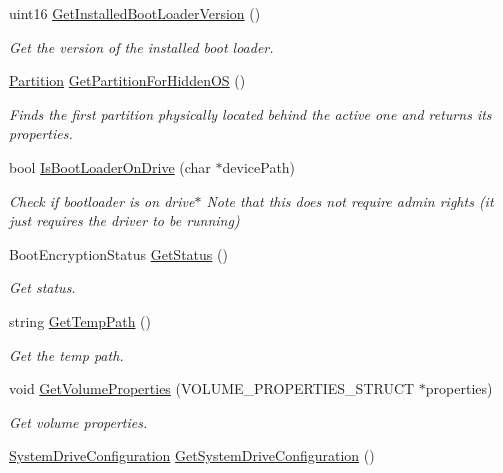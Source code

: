 \begin{DoxyCompactItemize}
uint16 \hyperlink{class_gost_crypt_1_1_boot_encryption_a438cec2387d7aab246d986d2a0128b21}{Get\+Installed\+Boot\+Loader\+Version} ()
\begin{DoxyCompactList}\small\item\em Get the version of the installed boot loader. \end{DoxyCompactList}\item 
\hyperlink{struct_gost_crypt_1_1_partition}{Partition} \hyperlink{class_gost_crypt_1_1_boot_encryption_a4af9421f27c8e568add543c8b09602b3}{Get\+Partition\+For\+Hidden\+OS} ()
\begin{DoxyCompactList}\small\item\em Finds the first partition physically located behind the active one and returns its properties. \end{DoxyCompactList}\item 
bool \hyperlink{class_gost_crypt_1_1_boot_encryption_a448f5e8fc2f4463a8147f702c2e2d217}{Is\+Boot\+Loader\+On\+Drive} (char $\ast$device\+Path)
\begin{DoxyCompactList}\small\item\em Check if bootloader is on drive$\ast$ Note that this does not require admin rights (it just requires the driver to be running) \end{DoxyCompactList}\item 
Boot\+Encryption\+Status \hyperlink{class_gost_crypt_1_1_boot_encryption_a55499453ff60a4484743a7f286702cba}{Get\+Status} ()
\begin{DoxyCompactList}\small\item\em Get status. \end{DoxyCompactList}\item 
string \hyperlink{class_gost_crypt_1_1_boot_encryption_ad7d1c3f18b8e3bc9133a1f8cabeb8f4d}{Get\+Temp\+Path} ()
\begin{DoxyCompactList}\small\item\em Get the temp path. \end{DoxyCompactList}\item 
void \hyperlink{class_gost_crypt_1_1_boot_encryption_a8113cd3021864fa8bbd421c33925f83d}{Get\+Volume\+Properties} (V\+O\+L\+U\+M\+E\+\_\+\+P\+R\+O\+P\+E\+R\+T\+I\+E\+S\+\_\+\+S\+T\+R\+U\+CT $\ast$properties)
\begin{DoxyCompactList}\small\item\em Get volume properties. \end{DoxyCompactList}\item 
\hyperlink{struct_gost_crypt_1_1_system_drive_configuration}{System\+Drive\+Configuration} \hyperlink{class_gost_crypt_1_1_boot_encryption_ab325c58a9939344bdfe056d20df0f5ff}{Get\+System\+Drive\+Configuration} ()

\end{DoxyCompactItemize}
